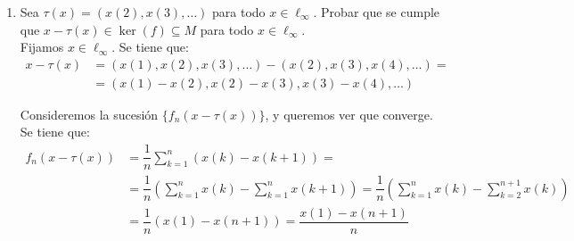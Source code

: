 \begin{ejercicio}
\begin{enumerate}
    Dado $x \in M$, se tiene que $\{f_n(x)\}$ converge, y por tanto $f(x) = \lim\limits_n f_n(x)$ está bien definido. Veamos que $f$ es lineal. Dado $x, y \in M$ y $\lambda \in \bb{K}$, se tiene que:
    \begin{align*}
        f(x + y) &= \lim_{n \to \infty} f_n(x + y) = \lim_{n \to \infty} (f_n(x) + f_n(y)) = \lim_{n \to \infty} f_n(x) + \lim_{n \to \infty} f_n(y) = f(x) + f(y) \\
        f(\lambda x) &= \lim_{n \to \infty} f_n(\lambda x) = \lim_{n \to \infty} (\lambda f_n(x)) = \lambda \lim_{n \to \infty} f_n(x) = \lambda f(x)
    \end{align*}

    Por tanto, $f$ es lineal. Veamos que $f$ es continuo. Dado $x \in M$, se tiene que:
    \begin{align*}
        |f(x)| &= \left|\lim_{n \to \infty} f_n(x)\right| = \lim_{n \to \infty} |f_n(x)| \leq \lim_{n \to \infty} \|f_n\| \cdot \|x\| = \lim_{n \to \infty} \|x\| = \|x\|
    \end{align*}

    Por tanto, $f$ es continuo y $\|f\| \leq 1$. Consideremos ahora la sucesión constantemente igual a 1, es decir, $x = (1, 1, 1, \dots)$, que trivialmente es convergente y por tanto $x \in c \subseteq M$, con $\|x\| = 1$. Se tiene que:
    \begin{align*}
        f(x) &= \lim_{n \to \infty} f_n(x) = \lim_{n \to \infty} x(n) = 1
    \end{align*}

    Por tanto, $\|f\| \geq |f(x)| = 1$. En vistas de que anteriormente habíamos probado que $\|f\| \leq 1$, obtenemos que $\|f\| = 1$.
    \item Sea $\tau(x) = (x(2), x(3), \dots)$ para todo $x \in \ell_\infty$. Probar que se cumple que $x - \tau(x) \in \ker(f) \subseteq M$ para todo $x \in \ell_\infty$.\\
    
    Fijamos $x \in \ell_\infty$. Se tiene que:
    \begin{align*}
        x-\tau(x) &= (x(1), x(2), x(3), \dots) - (x(2), x(3), x(4), \dots) =\\&= (x(1) - x(2), x(2) - x(3), x(3) - x(4), \dots)
    \end{align*}

    Consideremos la sucesión $\{f_n(x - \tau(x))\}$, y queremos ver que converge. Se tiene que:
    \begin{align*}
        f_n(x - \tau(x)) &= \dfrac{1}{n} \sum_{k = 1}^n (x(k) - x(k + 1)) =\\&= \dfrac{1}{n} \left(\sum_{k = 1}^n x(k) - \sum_{k = 1}^n x(k + 1)\right) = \dfrac{1}{n} \left(\sum_{k = 1}^n x(k) - \sum_{k = 2}^{n + 1} x(k)\right) \\
        &= \dfrac{1}{n} \left(x(1) - x(n + 1)\right) = \dfrac{x(1) - x(n + 1)}{n}
    \end{align*}


\end{enumerate}
\end{ejercicio}
